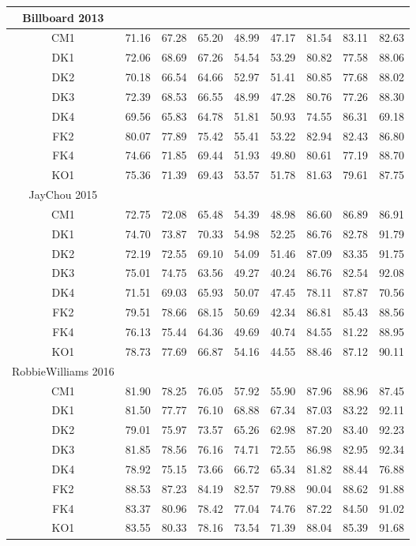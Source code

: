 \begin{table*}[htb]
\begin{tabular}{|c|c|c|c|c|c|c|c|c|}
Billboard 2013 \\ \hline
CM1 & 71.16 & 67.28 & 65.20 & 48.99 & 47.17 & 81.54 & 83.11 & 82.63\\ \hline
DK1 & 72.06 & 68.69 & 67.26 & 54.54 & 53.29 & 80.82 & 77.58 & 88.06\\ \hline
DK2 & 70.18 & 66.54 & 64.66 & 52.97 & 51.41 & 80.85 & 77.68 & 88.02\\ \hline
DK3 & 72.39 & 68.53 & 66.55 & 48.99 & 47.28 & 80.76 & 77.26 & 88.30\\ \hline
DK4 & 69.56 & 65.83 & 64.78 & 51.81 & 50.93 & 74.55 & 86.31 & 69.18\\ \hline
FK2 & 80.07 & 77.89 & 75.42 & 55.41 & 53.22 & 82.94 & 82.43 & 86.80\\ \hline
FK4 & 74.66 & 71.85 & 69.44 & 51.93 & 49.80 & 80.61 & 77.19 & 88.70\\ \hline
KO1 & 75.36 & 71.39 & 69.43 & 53.57 & 51.78 & 81.63 & 79.61 & 87.75\\ \hline
JayChou 2015 \\ \hline
CM1 & 72.75 & 72.08 & 65.48 & 54.39 & 48.98 & 86.60 & 86.89 & 86.91\\ \hline
DK1 & 74.70 & 73.87 & 70.33 & 54.98 & 52.25 & 86.76 & 82.78 & 91.79\\ \hline
DK2 & 72.19 & 72.55 & 69.10 & 54.09 & 51.46 & 87.09 & 83.35 & 91.75\\ \hline
DK3 & 75.01 & 74.75 & 63.56 & 49.27 & 40.24 & 86.76 & 82.54 & 92.08\\ \hline
DK4 & 71.51 & 69.03 & 65.93 & 50.07 & 47.45 & 78.11 & 87.87 & 70.56\\ \hline
FK2 & 79.51 & 78.66 & 68.15 & 50.69 & 42.34 & 86.81 & 85.43 & 88.56\\ \hline
FK4 & 76.13 & 75.44 & 64.36 & 49.69 & 40.74 & 84.55 & 81.22 & 88.95\\ \hline
KO1 & 78.73 & 77.69 & 66.87 & 54.16 & 44.55 & 88.46 & 87.12 & 90.11\\ \hline
RobbieWilliams 2016 \\ \hline
CM1 & 81.90 & 78.25 & 76.05 & 57.92 & 55.90 & 87.96 & 88.96 & 87.45\\ \hline
DK1 & 81.50 & 77.77 & 76.10 & 68.88 & 67.34 & 87.03 & 83.22 & 92.11\\ \hline
DK2 & 79.01 & 75.97 & 73.57 & 65.26 & 62.98 & 87.20 & 83.40 & 92.23\\ \hline
DK3 & 81.85 & 78.56 & 76.16 & 74.71 & 72.55 & 86.98 & 82.95 & 92.34\\ \hline
DK4 & 78.92 & 75.15 & 73.66 & 66.72 & 65.34 & 81.82 & 88.44 & 76.88\\ \hline
FK2 & 88.53 & 87.23 & 84.19 & 82.57 & 79.88 & 90.04 & 88.62 & 91.88\\ \hline
FK4 & 83.37 & 80.96 & 78.42 & 77.04 & 74.76 & 87.22 & 84.50 & 91.02\\ \hline
KO1 & 83.55 & 80.33 & 78.16 & 73.54 & 71.39 & 88.04 & 85.39 & 91.68\\ \hline
\end{tabular}
\end{table*}
